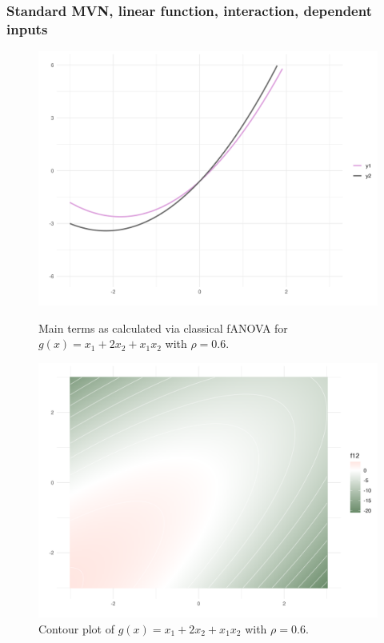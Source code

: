 \subsubsection*{Standard MVN, linear function, interaction, dependent inputs}
\begin{figure}[htpb]
    \centering
    \begin{minipage}[t]{0.49\textwidth}
        \centering
        \includegraphics[width=\textwidth]{images/p_main_effect_ex1_rho06.png}
        \caption{Main terms as calculated via classical fANOVA for $g(x) = x_1 + 2 x_2 + x_1 x_2$ with $\rho = 0.6$.}
        \label{fig:main_effects_ex1_rho06}
    \end{minipage}%
    \hfill
    \begin{minipage}[t]{0.49\textwidth}
        \centering
        \includegraphics[width=\textwidth]{images/p_contour_ex1_rho06.png}
        \caption{Contour plot of $g(x) = x_1 + 2 x_2 + x_1 x_2$ with $\rho = 0.6$.}
        \label{fig:contour_ex1_rho06}
    \end{minipage}
\end{figure}

